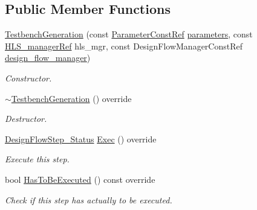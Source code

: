 \subsection*{Public Member Functions}
\begin{DoxyCompactItemize}
\item 
\hyperlink{classTestbenchGeneration_a13107e156161753542503982023d0929}{Testbench\+Generation} (const \hyperlink{Parameter_8hpp_a37841774a6fcb479b597fdf8955eb4ea}{Parameter\+Const\+Ref} \hyperlink{classDesignFlowStep_a802eaafe8013df706370679d1a436949}{parameters}, const \hyperlink{hls__manager_8hpp_acd3842b8589fe52c08fc0b2fcc813bfe}{H\+L\+S\+\_\+manager\+Ref} hls\+\_\+mgr, const Design\+Flow\+Manager\+Const\+Ref \hyperlink{classDesignFlowStep_ab770677ddf087613add30024e16a5554}{design\+\_\+flow\+\_\+manager})
\begin{DoxyCompactList}\small\item\em Constructor. \end{DoxyCompactList}\item 
\hyperlink{classTestbenchGeneration_a4238f9a5c5f3b4cabad4b1a3ce50b97c}{$\sim$\+Testbench\+Generation} () override
\begin{DoxyCompactList}\small\item\em Destructor. \end{DoxyCompactList}\item 
\hyperlink{design__flow__step_8hpp_afb1f0d73069c26076b8d31dbc8ebecdf}{Design\+Flow\+Step\+\_\+\+Status} \hyperlink{classTestbenchGeneration_a85c026e1008605a36960dbbd4f80a14e}{Exec} () override
\begin{DoxyCompactList}\small\item\em Execute this step. \end{DoxyCompactList}\item 
bool \hyperlink{classTestbenchGeneration_acf3bc257f411c14241561002b00a72c1}{Has\+To\+Be\+Executed} () const override
\begin{DoxyCompactList}\small\item\em Check if this step has actually to be executed. \end{DoxyCompactList}\end{DoxyCompactItemize}
